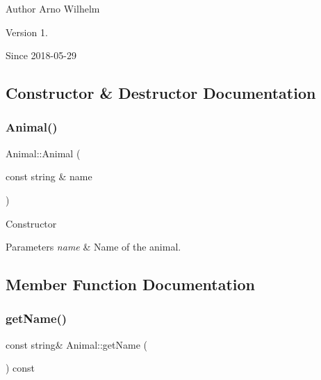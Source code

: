 \begin{DoxyAuthor}{Author}
Arno Wilhelm 
\end{DoxyAuthor}
\begin{DoxyVersion}{Version}
1. 
\end{DoxyVersion}
\begin{DoxySince}{Since}
2018-\/05-\/29 
\end{DoxySince}


\subsection{Constructor \& Destructor Documentation}
\mbox{\label{classAnimal_a4ef4b49b9ed502193d9a1e447af9dca7}} 
\subsubsection{\texorpdfstring{Animal()}{Animal()}}
{\footnotesize\ttfamily Animal\+::\+Animal (\begin{DoxyParamCaption}\item[{const string \&}]{name }\end{DoxyParamCaption})\hspace{0.3cm}{\ttfamily [inline]}}

Constructor


\begin{DoxyParams}{Parameters}
{\em name} & Name of the animal. \\
\hline
\end{DoxyParams}


\subsection{Member Function Documentation}
\mbox{\label{classAnimal_a9e5f35bbcafaddb2af949273d04a0055}} 
\subsubsection{\texorpdfstring{get\+Name()}{getName()}}
{\footnotesize\ttfamily const string\& Animal\+::get\+Name (\begin{DoxyParamCaption}{ }\end{DoxyParamCaption}) const\hspace{0.3cm}{\ttfamily [inline]}}

